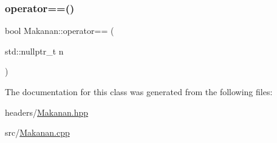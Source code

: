 \mbox{\label{class_makanan_ac256031452bfaebf4b975793bcf6b318}} 
\subsubsection{\texorpdfstring{operator==()}{operator==()}\hspace{0.1cm}{\footnotesize\ttfamily [2/2]}}
{\footnotesize\ttfamily bool Makanan\+::operator== (\begin{DoxyParamCaption}\item[{std\+::nullptr\+\_\+t}]{n }\end{DoxyParamCaption})}



The documentation for this class was generated from the following files\+:\begin{DoxyCompactItemize}
\item 
headers/\mbox{\hyperlink{_makanan_8hpp}{Makanan.\+hpp}}\item 
src/\mbox{\hyperlink{_makanan_8cpp}{Makanan.\+cpp}}\end{DoxyCompactItemize}
